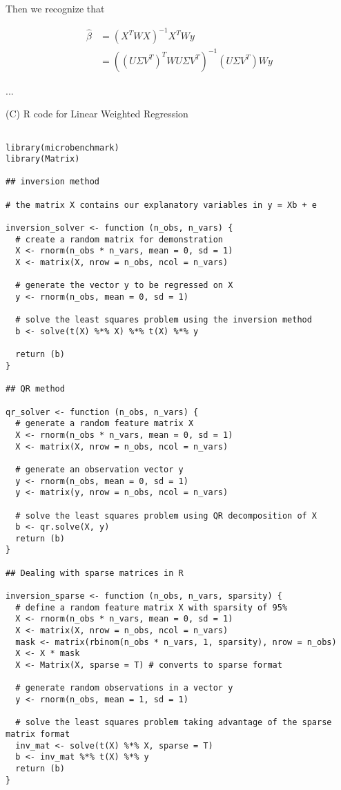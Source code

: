 \documentclass{article}
\begin{document}
Then we recognize that 

\begin{align}
	\hat{\beta} &= (X^T WX)^{-1} X^T W y \\
	&= ((U\Sigma V^T)^T WU\Sigma V^T)^{-1} (U\Sigma V^T) Wy
\end{align}

...


(C) R code for Linear Weighted Regression

\begin{lstlisting}

library(microbenchmark)
library(Matrix)

## inversion method

# the matrix X contains our explanatory variables in y = Xb + e

inversion_solver <- function (n_obs, n_vars) {
  # create a random matrix for demonstration
  X <- rnorm(n_obs * n_vars, mean = 0, sd = 1)
  X <- matrix(X, nrow = n_obs, ncol = n_vars)
  
  # generate the vector y to be regressed on X
  y <- rnorm(n_obs, mean = 0, sd = 1)
  
  # solve the least squares problem using the inversion method 
  b <- solve(t(X) %*% X) %*% t(X) %*% y
  
  return (b)
}

## QR method

qr_solver <- function (n_obs, n_vars) {
  # generate a random feature matrix X
  X <- rnorm(n_obs * n_vars, mean = 0, sd = 1)
  X <- matrix(X, nrow = n_obs, ncol = n_vars)
  
  # generate an observation vector y
  y <- rnorm(n_obs, mean = 0, sd = 1)
  y <- matrix(y, nrow = n_obs, ncol = n_vars)
  
  # solve the least squares problem using QR decomposition of X
  b <- qr.solve(X, y)
  return (b)
}

## Dealing with sparse matrices in R

inversion_sparse <- function (n_obs, n_vars, sparsity) {
  # define a random feature matrix X with sparsity of 95%
  X <- rnorm(n_obs * n_vars, mean = 0, sd = 1)
  X <- matrix(X, nrow = n_obs, ncol = n_vars)
  mask <- matrix(rbinom(n_obs * n_vars, 1, sparsity), nrow = n_obs)
  X <- X * mask
  X <- Matrix(X, sparse = T) # converts to sparse format
  
  # generate random observations in a vector y
  y <- rnorm(n_obs, mean = 1, sd = 1)
  
  # solve the least squares problem taking advantage of the sparse matrix format
  inv_mat <- solve(t(X) %*% X, sparse = T)
  b <- inv_mat %*% t(X) %*% y
  return (b)
}


\end{lstlisting}
\end{document}
